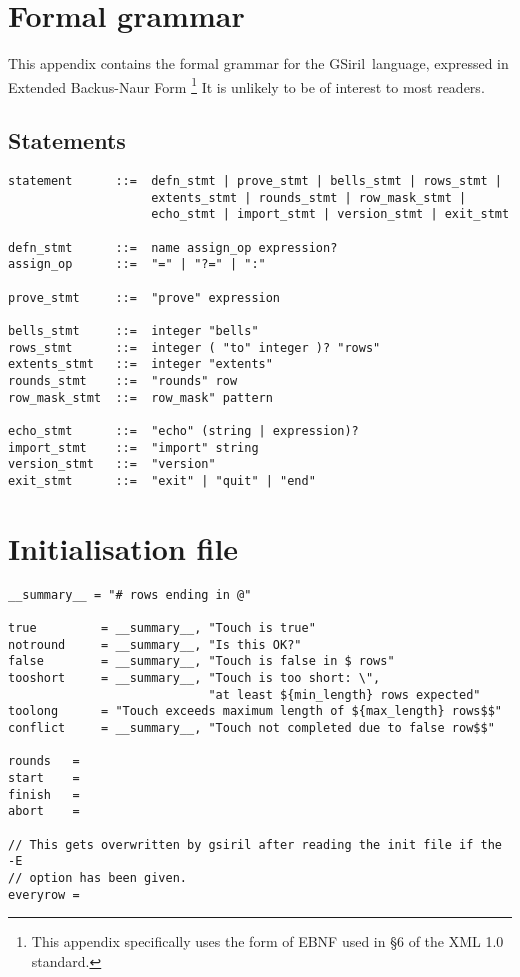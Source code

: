 \documentclass[a4paper,11pt,oneside]{book}
\def\gsiril{GSiril}
\begin{document}
\appendix
\chapter{Formal grammar}

This appendix contains the formal grammar for the \gsiril\ language,
expressed in Extended Backus-Naur Form%
\footnote{This appendix specifically
uses the form of EBNF used in §6 of the XML 1.0 standard.}  
It is unlikely to be of interest to most readers.

\section{Statements}
\label{stmt_grammar}

\begin{Verbatim}[xleftmargin=0pt]
statement      ::=  defn_stmt | prove_stmt | bells_stmt | rows_stmt |
                    extents_stmt | rounds_stmt | row_mask_stmt | 
                    echo_stmt | import_stmt | version_stmt | exit_stmt

defn_stmt      ::=  name assign_op expression?
assign_op      ::=  "=" | "?=" | ":"

prove_stmt     ::=  "prove" expression
 
bells_stmt     ::=  integer "bells"
rows_stmt      ::=  integer ( "to" integer )? "rows"
extents_stmt   ::=  integer "extents"
rounds_stmt    ::=  "rounds" row
row_mask_stmt  ::=  row_mask" pattern

echo_stmt      ::=  "echo" (string | expression)?
import_stmt    ::=  "import" string
version_stmt   ::=  "version"
exit_stmt      ::=  "exit" | "quit" | "end"
\end{Verbatim}

\chapter{Initialisation file}\label{initfile}

\begin{Verbatim}[xleftmargin=0pt]
__summary__ = "# rows ending in @"

true         = __summary__, "Touch is true"
notround     = __summary__, "Is this OK?"
false        = __summary__, "Touch is false in $ rows"
tooshort     = __summary__, "Touch is too short: \",
                            "at least ${min_length} rows expected"
toolong      = "Touch exceeds maximum length of ${max_length} rows$$"
conflict     = __summary__, "Touch not completed due to false row$$"

rounds   =
start    =
finish   =
abort    =

// This gets overwritten by gsiril after reading the init file if the -E 
// option has been given.
everyrow = 
\end{Verbatim}
\end{document}
